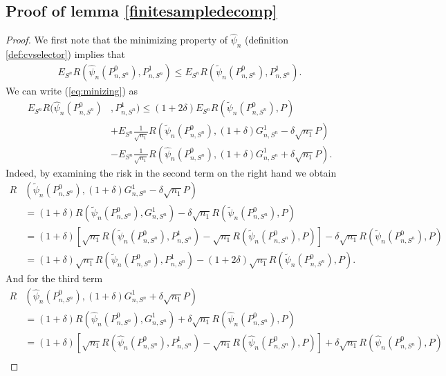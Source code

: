 \documentclass[11pt, a4paper]{article}
\theoremstyle{definition}
\theoremstyle{remark}
\newcommand{\la}{\psi}
\newcommand{\Sn}{S^n}
\begin{document}
\subsection{Proof of lemma \ref{finitesampledecomp}}
\begin{proof}
    We first note that the minimizing property of $ \hat{\la}_n $ (definition \ref{def:cvselector}) implies that 
    \begin{align}
        E_{\Sn} R( \hat{\la}_n(P_{n, \Sn}^{0}), P_{n, \Sn}^{1} ) \leq E_{\Sn} R( \tilde{\la}_n(P_{n, \Sn}^{0}) , P_{n, \Sn}^{1}  ). \label{eq:minizing} 
    \end{align}
   We can write (\ref{eq:minizing}) as  
   \begin{align*}
       E_{\Sn} R( \hat{\la}_n(P_{n, \Sn}^{0} )&, P_{n, \Sn}^{1}) \leq (1 + 2 \delta) E_{\Sn} R( \tilde{\la}_n(P_{n, \Sn}^{0}) , P ) \\ 
               &+E_{\Sn} \frac{1}{\sqrt{n_1} } R(\tilde{\la}_n (P_{n, \Sn}^{0}), (1 + \delta) G_{n,\Sn}^{1} - \delta \sqrt{n_1} P)\\
               &-E_{\Sn} \frac{1}{\sqrt{n_1} } R(\hat{\la}_n(P_{n, \Sn}^{0}), (1 + \delta) G_{n,\Sn}^{1} + \delta \sqrt{n_1} P)  .
   \end{align*}
  Indeed, by examining the risk in the second term on the right hand we obtain 
  \begin{align*}
      R&(\tilde{\la}_n (P_{n, \Sn}^{0}), (1 + \delta) G_{n,\Sn}^{1} - \delta \sqrt{n_1} P)\\
                    &= (1 + \delta) R(\tilde{\la}_n (P_{n, \Sn}^{0}), G_{n,\Sn}^{1}) - \delta \sqrt{n_1} R(\tilde{\la}_n (P_{n, \Sn}^{0}), P) \\ 
                    &= (1 + \delta) \left[\sqrt{n_1} R(\tilde{\la}_n (P_{n, \Sn}^{0}), P_{n,\Sn}^{1}) - \sqrt{n_1} R(\tilde{\la}_n (P_{n, \Sn}^{0}), P)\right] - \delta \sqrt{n_1} R(\tilde{\la}_n (P_{n, \Sn}^{0}), P)\\ 
                    &= (1 + \delta) \sqrt{n_1} R(\tilde{\la}_n (P_{n, \Sn}^{0}), P_{n,\Sn}^{1}) - (1 + 2\delta)\sqrt{n_1}   R(\tilde{\la}_n (P_{n, \Sn}^{0}), P).
  \end{align*}
  And for the third term 
  \begin{align*}
     R&(\hat{\la}_n(P_{n, \Sn}^{0}), (1 + \delta) G_{n,\Sn}^{1} + \delta \sqrt{n_1} P)\\
       &= (1 + \delta) R(\hat{\la}_n (P_{n, \Sn}^{0}), G_{n,\Sn}^{1}) + \delta \sqrt{n_1} R(\hat{\la}_n (P_{n, \Sn}^{0}), P) \\ 
       &= (1 + \delta) \left[\sqrt{n_1} R(\hat{\la}_n (P_{n, \Sn}^{0}), P_{n,\Sn}^{1}) - \sqrt{n_1} R(\hat{\la}_n (P_{n, \Sn}^{0}), P)\right] + \delta \sqrt{n_1} R(\hat{\la}_n (P_{n, \Sn}^{0}), P)\\ 

\end{align*}
\end{proof}
\end{document}
